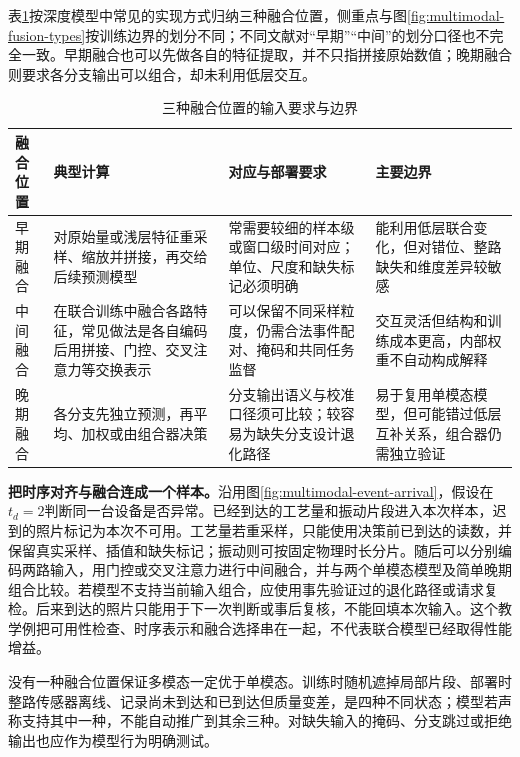 表\ref{tab:multimodal-fusion-choices}按深度模型中常见的实现方式归纳三种融合位置，侧重点与图\ref{fig:multimodal-fusion-types}按训练边界的划分不同；不同文献对“早期”“中间”的划分口径也不完全一致。早期融合也可以先做各自的特征提取，并不只指拼接原始数值；晚期融合则要求各分支输出可以组合，却未利用低层交互。

\begin{table}[htbp]
\centering
\caption{三种融合位置的输入要求与边界}
\label{tab:multimodal-fusion-choices}
\footnotesize
\setlength{\tabcolsep}{2pt}
\begin{tabular}{@{}>{\raggedright\arraybackslash}m{1.7cm}>{\raggedright\arraybackslash}m{3.4cm}>{\raggedright\arraybackslash}m{3.7cm}>{\raggedright\arraybackslash}m{3.4cm}@{}}
\toprule
融合位置 & 典型计算 & 对应与部署要求 & 主要边界 \\
\midrule
早期融合 & 对原始量或浅层特征重采样、缩放并拼接，再交给后续预测模型 & 常需要较细的样本级或窗口级时间对应；单位、尺度和缺失标记必须明确 & 能利用低层联合变化，但对错位、整路缺失和维度差异较敏感 \\
中间融合 & 在联合训练中融合各路特征，常见做法是各自编码后用拼接、门控、交叉注意力等交换表示 & 可以保留不同采样粒度，仍需合法事件配对、掩码和共同任务监督 & 交互灵活但结构和训练成本更高，内部权重不自动构成解释 \\
晚期融合 & 各分支先独立预测，再平均、加权或由组合器决策 & 分支输出语义与校准口径须可比较；较容易为缺失分支设计退化路径 & 易于复用单模态模型，但可能错过低层互补关系，组合器仍需独立验证 \\
\bottomrule
\end{tabular}
\end{table}

\textbf{把时序对齐与融合连成一个样本。}沿用图\ref{fig:multimodal-event-arrival}，假设在$t_d=2$判断同一台设备是否异常。已经到达的工艺量和振动片段进入本次样本，迟到的照片标记为本次不可用。工艺量若重采样，只能使用决策前已到达的读数，并保留真实采样、插值和缺失标记；振动则可按固定物理时长分片。随后可以分别编码两路输入，用门控或交叉注意力进行中间融合，并与两个单模态模型及简单晚期组合比较。若模型不支持当前输入组合，应使用事先验证过的退化路径或请求复检。后来到达的照片只能用于下一次判断或事后复核，不能回填本次输入。这个教学例把可用性检查、时序表示和融合选择串在一起，不代表联合模型已经取得性能增益。

没有一种融合位置保证多模态一定优于单模态。训练时随机遮掉局部片段、部署时整路传感器离线、记录尚未到达和已到达但质量变差，是四种不同状态；模型若声称支持其中一种，不能自动推广到其余三种。对缺失输入的掩码、分支跳过或拒绝输出也应作为模型行为明确测试。

